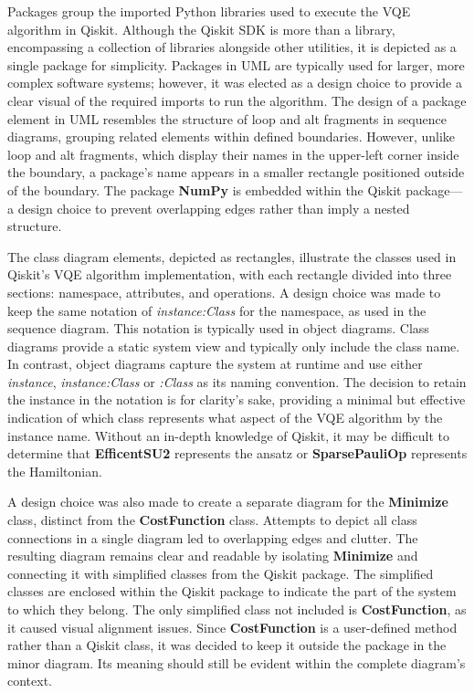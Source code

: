 \documentclass{article}
\begin{document}
{Packages group the imported Python libraries used to execute the VQE algorithm in Qiskit. Although the Qiskit SDK is more than a library, encompassing a collection of libraries alongside other utilities\cite{SheriefAbul-Ezz}, it is depicted as a single package for simplicity. Packages in UML are typically used for larger, more complex software systems\cite{VisualParadigm}; however, it was elected as a design choice to provide a clear visual of the required imports to run the algorithm. The design of a package element in UML resembles the structure of loop and alt fragments in sequence diagrams, grouping related elements within defined boundaries. However, unlike loop and alt fragments, which display their names in the upper-left corner inside the boundary, a package’s name appears in a smaller rectangle positioned outside of the boundary. The package \textbf{NumPy} is embedded within the Qiskit package—a design choice to prevent overlapping edges rather than imply a nested structure.

The class diagram elements, depicted as rectangles, illustrate the classes used in Qiskit’s VQE algorithm implementation, with each rectangle divided into three sections: namespace, attributes, and operations. A design choice was made to keep the same notation of \textit{instance:Class} for the namespace, as used in the sequence diagram. This notation is typically used in object diagrams. Class diagrams provide a static system view and typically only include the class name. In contrast, object diagrams capture the system at runtime and use either \textit{instance}, \textit{instance:Class} or \textit{:Class} as its naming convention\cite{Seidl_Scholz_Huemer_Kappel_Duffy_2014}. The decision to retain the instance in the notation is for clarity's sake, providing a minimal but effective indication of which class represents what aspect of the VQE algorithm by the instance name. Without an in-depth knowledge of Qiskit, it may be difficult to determine that \textbf{EfficentSU2} represents the ansatz or \textbf{SparsePauliOp} represents the Hamiltonian.

A design choice was also made to create a separate diagram for the \textbf{Minimize} class, distinct from the \textbf{CostFunction} class. Attempts to depict all class connections in a single diagram led to overlapping edges and clutter. The resulting diagram remains clear and readable by isolating \textbf{Minimize} and connecting it with simplified classes from the Qiskit package. The simplified classes are enclosed within the Qiskit package to indicate the part of the system to which they belong. The only simplified class not included is \textbf{CostFunction}, as it caused visual alignment issues. Since \textbf{CostFunction} is a user-defined method rather than a Qiskit class, it was decided to keep it outside the package in the minor diagram. Its meaning should still be evident within the complete diagram's context.

}
\end{document}
